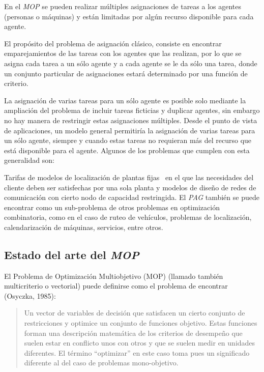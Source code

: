\documentclass[letterpaper,10pt]{article}
\begin{document}
 En el \emph{MOP} se pueden realizar múltiples asignaciones de tareas a los agentes (personas o máquinas) y están limitadas por algún recurso disponible para cada agente.
\newline

 El propósito del problema de asignación clásico, consiste en encontrar emparejamientos de las tareas  con los agentes que las realizan, por lo que se asigna cada tarea a un sólo agente y a cada agente se le da sólo una tarea, donde un conjunto particular de asignaciones estará determinado por una función de criterio.
\newline

La asignación de varias tareas para un sólo agente es posible solo mediante la ampliación del problema de incluir tareas ficticias y duplicar agentes, sin embargo no hay manera de restringir estas asignaciones múltiples. Desde el punto de vista de aplicaciones, un modelo general permitiría la asignación de varias tareas para un sólo agente, siempre y cuando estas tareas no requieran más del recurso que está disponible para el agente. Algunos de los problemas que cumplen con esta generalidad son: 
\newline

Tarifas de modelos de localización de plantas fijas \ en el que las necesidades del cliente deben ser satisfechas por una sola planta y modelos de diseño de redes de comunicación con cierto nodo de capacidad restringida. El \emph{PAG} también se puede encontrar como un sub-problema de otros problemas en optimización combinatoria, como  en el caso de  ruteo de vehículos, problemas de localización, calendarización de máquinas, servicios, entre otros.
\newline

\subsection{Estado del arte del \emph{MOP}}

El Problema de Optimización Multiobjetivo (MOP) (llamado también
multicriterio o vectorial) puede definirse como el problema de
encontrar (Osyczka, 1985)\cite{Osyczka1985193}:
\begin{quote}
Un vector de variables de decisión que satisfacen un cierto
conjunto de restricciones y optimice un conjunto de funciones
objetivo. Estas funciones forman una descripción matemática
de los criterios de desempeño que suelen estar en conflicto
unos con otros y que se suelen medir en unidades diferentes.
El término ``optimizar'' en este caso toma pues un significado
diferente al del caso de problemas mono-objetivo.
\end{quote}
\end{document}
